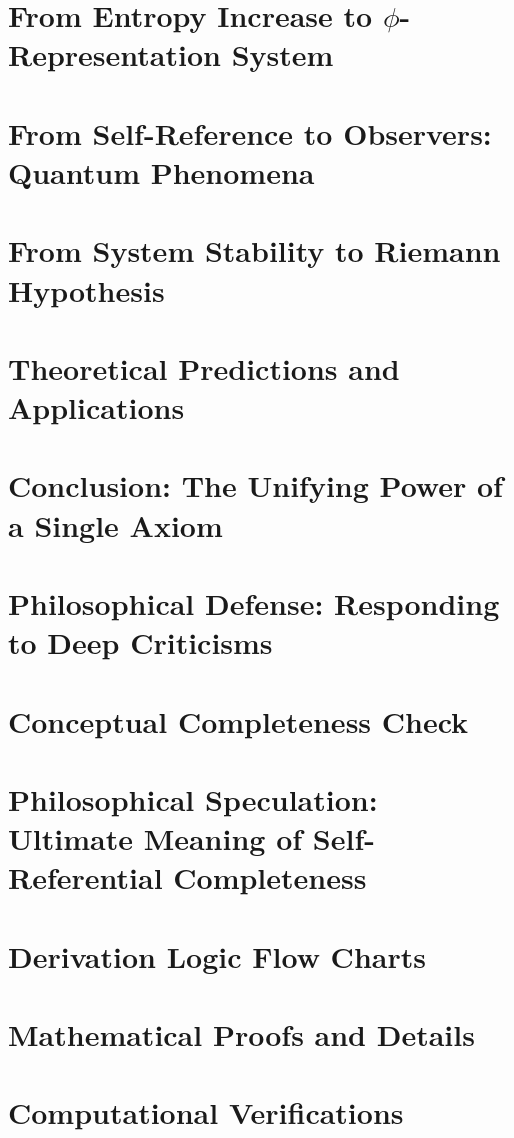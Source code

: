 \documentclass[12pt,a4paper]{book}
\theoremstyle{definition}
\theoremstyle{colored}
\begin{document}
\chapter[From Entropy Increase to Phi-Representation System]{From Entropy Increase to $\phi$-Representation System}
\label{ch:encoding}


\chapter{From Self-Reference to Observers: Quantum Phenomena}
\label{ch:quantum}


\chapter{From System Stability to Riemann Hypothesis}
\label{ch:riemann}


\chapter{Theoretical Predictions and Applications}
\label{ch:applications}


\chapter{Conclusion: The Unifying Power of a Single Axiom}
\label{ch:conclusion}


\chapter{Philosophical Defense: Responding to Deep Criticisms}
\label{ch:defense}


\chapter{Conceptual Completeness Check}
\label{ch:completeness}


\chapter{Philosophical Speculation: Ultimate Meaning of Self-Referential Completeness}
\label{ch:philosophy}


\appendix

\chapter{Derivation Logic Flow Charts}
\label{app:flowcharts}


\chapter{Mathematical Proofs and Details}
\label{app:proofs}


\chapter{Computational Verifications}
\label{app:computational}





\printindex
\end{document}
